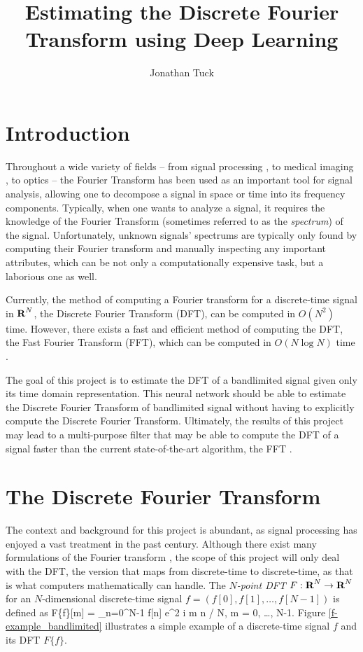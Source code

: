 \documentclass[12pt]{article}
\title{
Estimating the Discrete Fourier Transform using Deep Learning
}
\author{Jonathan Tuck}
\begin{document}
\maketitle

\newpage
\tableofcontents
\newpage

\section{Introduction}
Throughout a wide variety of fields -- from signal processing \cite{OS:99}, to medical imaging \cite{S:00}, 
to optics \cite{G:96} -- the Fourier Transform has been used as an important tool for signal analysis, allowing 
one to decompose a signal in space or time into its frequency components. Typically, when one wants to analyze a 
signal, it requires the knowledge of the Fourier Transform (sometimes referred to as the \emph{spectrum}) of the 
signal. Unfortunately, unknown signals' spectrums are typically only found by computing their Fourier transform 
and manually inspecting any important attributes, which can be not only a computationally expensive task, but a 
laborious one as well. 

Currently, the method of computing a Fourier transform for a discrete-time signal in ${\mbox{\bf R}}^N$, the Discrete 
Fourier Transform (DFT), can be computed in $O(N^2)$ time. However, there exists a fast and efficient 
method of computing the DFT, the Fast Fourier Transform (FFT), which can be computed 
in $O(N \log N)$ time \cite{B:78,O:17}.

The goal of this project is to estimate the DFT of a bandlimited signal given only 
its time domain representation. This neural network should be able to estimate the Discrete Fourier 
Transform of bandlimited signal without having to explicitly compute the Discrete Fourier Transform. 
Ultimately, the results of this project may lead to a multi-purpose filter that may be able to compute 
the DFT of a signal faster than the current state-of-the-art algorithm, the FFT \cite{CT:65}.

\section{The Discrete Fourier Transform}
The context and background for this project is abundant, as signal processing has enjoyed a vast treatment
in the past century. Although there exist many formulations of the Fourier transform \cite{O:17}, the scope 
of this project will only deal with the DFT, the version that maps from discrete-time to discrete-time, as 
that is what computers mathematically can handle. The \emph{$N$-point DFT} $F: {\mbox{\bf R}}^N \rightarrow {\mbox{\bf R}}^N$ for an 
$N$-dimensional discrete-time signal \cite{B:78,O:17} $f = (f[0], f[1], \ldots, f[N-1])$ is defined as
\BEQ \label{e-DFT}
F\{f\}[m] = \sum_{n=0}^{N-1} f[n] e^{2 \pi i m n / N}, \quad m = 0, \ldots, N-1.
\EEQ
Figure \ref{f-example_bandlimited} illustrates a simple example of a discrete-time 
signal $f$ and its DFT $F\{f\}.$
\end{document}
